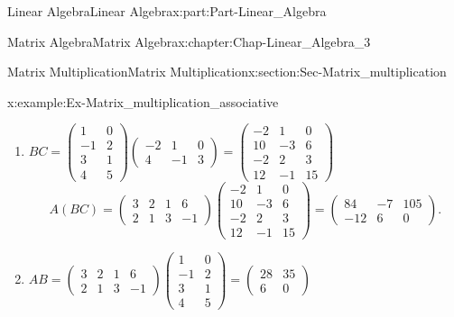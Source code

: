 \documentclass[oneside,10pt,]{book}
\numberwithin{equation}{section}
\newcommand{\amp}{&}
\begin{document}
\begin{partptx}{Linear Algebra}{}{Linear Algebra}{}{}{x:part:Part-Linear_Algebra}
\begin{chapterptx}{Matrix Algebra}{}{Matrix Algebra}{}{}{x:chapter:Chap-Linear_Algebra_3}
\begin{sectionptx}{Matrix Multiplication}{}{Matrix Multiplication}{}{}{x:section:Sec-Matrix_multiplication}
\begin{example}{}{x:example:Ex-Matrix_multiplication_associative}
\noindent\hypertarget{g:solution:id570556}{}%
\begin{enumerate}[label=\alph*]
\item{}\(BC = \begin{pmatrix} 1 \amp 0 \\ -1 \amp 2 \\ 3 \amp 1 \\ 4 \amp 5 \end{pmatrix}\begin{pmatrix}-2 \amp 1 \amp 0 \\ 4 \amp -1 \amp 3\end{pmatrix} = \begin{pmatrix} -2 \amp 1 \amp 0\\ 10 \amp -3 \amp 6 \\ -2 \amp 2 \amp 3 \\ 12 \amp -1 \amp 15\end{pmatrix}\)%
\begin{equation*}
A(BC) = \begin{pmatrix} 3\amp 2 \amp 1 \amp 6 \\ 2 \amp 1 \amp 3 \amp -1\end{pmatrix}\begin{pmatrix} -2 \amp 1 \amp 0\\ 10 \amp -3 \amp 6 \\ -2 \amp 2 \amp 3 \\ 12 \amp -1 \amp 15\end{pmatrix} = \begin{pmatrix} 84 \amp -7 \amp 105 \\ -12 \amp 6 \amp 0\end{pmatrix}.
\end{equation*}
%
\item{}\(AB = \begin{pmatrix} 3\amp 2 \amp 1 \amp 6 \\ 2 \amp 1 \amp 3 \amp -1\end{pmatrix} \begin{pmatrix} 1 \amp 0 \\ -1 \amp 2 \\ 3 \amp 1 \\ 4 \amp 5 \end{pmatrix} = \begin{pmatrix} 28 \amp 35 \\ 6 \amp 0\end{pmatrix}\)%
\begin{equation*}

\end{equation*}
\end{enumerate}
\end{example}
\end{sectionptx}
\end{chapterptx}
\end{partptx}
\end{document}
